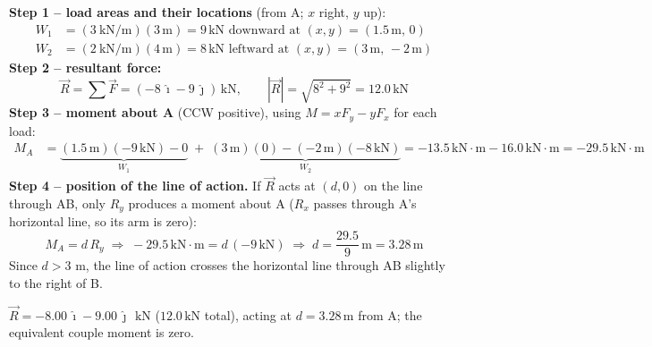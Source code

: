 \documentclass[11pt]{article}
\newcommand{\kN}{\,\mathrm{kN}}
\newcommand{\m}{\,\mathrm{m}}
\newcommand{\kNm}{\,\mathrm{kN{\cdot}m}}
\begin{document}
{
}{
\textbf{Step 1 -- load areas and their locations} (from A; $x$ right, $y$ up):
\begin{align*}
W_1 &= (3\ \mathrm{kN/m})(3\m) = 9\kN \text{ downward at } (x,y)=(1.5\m,\,0)\\
W_2 &= (2\ \mathrm{kN/m})(4\m) = 8\kN \text{ leftward at } (x,y)=(3\m,\,-2\m)
\end{align*}
\textbf{Step 2 -- resultant force:}
\[
\vec{R} = \sum\vec{F} = (-8\,\hat{\imath} - 9\,\hat{\jmath})\kN, \qquad |\vec{R}| = \sqrt{8^2+9^2} = 12.0\kN
\]
\textbf{Step 3 -- moment about A} (CCW positive), using $M = xF_y - yF_x$ for each load:
\begin{align*}
M_A &= \underbrace{(1.5\m)(-9\kN) - 0}_{W_1}\; +\; \underbrace{(3\m)(0) - (-2\m)(-8\kN)}_{W_2}
    = -13.5\kNm - 16.0\kNm = -29.5\kNm
\end{align*}
\textbf{Step 4 -- position of the line of action.} If $\vec{R}$ acts at $(d,0)$ on the line through AB, only $R_y$ produces a moment about A ($R_x$ passes through A's horizontal line, so its arm is zero):
\[
M_A = d\,R_y \;\Rightarrow\; -29.5\kNm = d\,(-9\kN) \;\Rightarrow\; d = \frac{29.5}{9}\m = 3.28\m
\]
Since $d>3$ m, the line of action crosses the horizontal line through AB slightly to the right of B.

}{
$\vec{R} = -8.00\,\hat{\imath} - 9.00\,\hat{\jmath}\ \kN$ ($12.0\kN$ total), acting at $d = 3.28\m$ from A; the equivalent couple moment is zero.
}
\end{document}
